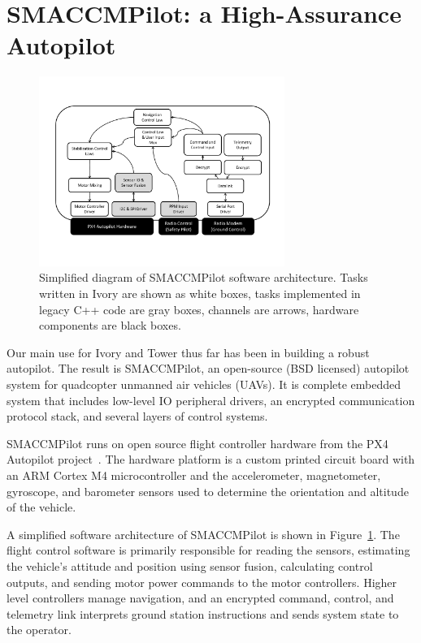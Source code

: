 \section{SMACCMPilot: a High-Assurance Autopilot}
\label{sec:smaccmpilot}

\begin{figure}[ht!]
  \begin{center}
\includegraphics[width=8cm]{figures/smaccmpilot-diagram-jan14}
  \end{center}
\caption[SMACCMPilot software architecture]{
Simplified diagram of SMACCMPilot
software architecture. Tasks written in Ivory are shown as white boxes,
tasks implemented in legacy C++ code are gray boxes,
channels are arrows,
hardware components are black boxes.}
\label{fig:smaccmpilotSwArch}
\end{figure}

Our main use for Ivory and Tower thus far has been in building a robust
autopilot. The result is SMACCMPilot, an open-source (BSD licensed) autopilot
system for quadcopter unmanned air vehicles (UAVs).  It is complete embedded
system that includes low-level IO
peripheral drivers, an encrypted communication protocol stack, and several
layers of control systems.

SMACCMPilot runs on open source flight controller hardware from the PX4
Autopilot project~\cite{px4-proj}. The hardware platform is
a custom printed circuit board with an ARM Cortex M4 microcontroller and the
accelerometer, magnetometer, gyroscope, and barometer sensors used to
determine the orientation and altitude of the vehicle.

A simplified software architecture of SMACCMPilot is shown in
Figure~\ref{fig:smaccmpilotSwArch}.
The flight control software is primarily responsible for reading the sensors,
estimating the vehicle's attitude and position using sensor fusion, calculating
control outputs, and sending motor power commands to the motor controllers.
Higher level controllers manage navigation, and an encrypted command, control,
and telemetry link interprets ground station instructions and sends system state
to the operator.

